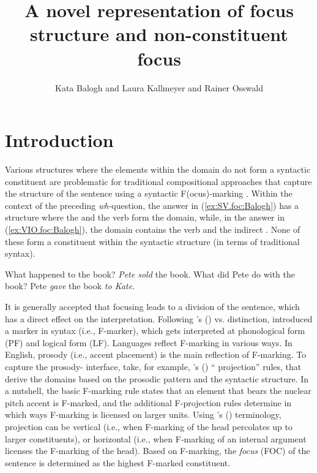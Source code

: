 \documentclass[output=paper,colorlinks,citecolor=brown]{langscibook}
\author{Kata Balogh\orcid{}\affiliation{Heinrich-Heine-Universit\"at D\"usseldorf} and Laura Kallmeyer\orcid{}\affiliation{Heinrich-Heine-Universit\"at D\"usseldorf} and Rainer Osswald\orcid{}\affiliation{Heinrich-Heine-Universit\"at D\"usseldorf}}
\title{A novel representation of focus structure and non-constituent focus }
\begin{document}
\maketitle

\section{Introduction}\label{sec:intro:Balogh}

Various  structures where the elements within the  domain do not form a syntactic constituent are problematic for traditional compositional approaches that capture the  structure of the sentence using a syntactic F(ocus)-marking \citep[see][]{krifka:92,buring:16}. Within the context of the preceding \textit{wh-}question, the answer in (\ref{ex:SV.foc:Balogh}) has a  structure where the  and the verb form the  domain, while, in the answer in (\ref{ex:VIO.foc:Balogh}), the  domain contains the verb and the indirect . None of these form a constituent within the syntactic structure (in terms of traditional syntax).

\ea\label{ex:base:Balogh}
    \ea\label{ex:SV.foc:Balogh} 
    What happened to the book? \emph{Pete sold} the book.
    \ex\label{ex:VIO.foc:Balogh}
    What did Pete do with the book? Pete \emph{gave} the book \emph{to Kate}.
    \z
\z

It is generally accepted that focusing leads to a division of the sentence, which has a direct effect on the interpretation. 
Following 
\citeauthor{chomsky:71}'s (\citeyear{chomsky:71})  vs.  distinction, \citet[][240]{jackendoff:72} introduced a  marker in syntax (i.e., F-marker), which gets interpreted at phonological form (PF) and logical form (LF). Languages reflect F-marking in various ways. In English, prosody (i.e., accent placement) is the main reflection of F-marking. To capture the prosody- interface, take, for example, 
\citeauthor{selkirk:95}'s (\citeyear{selkirk:95}) `` projection'' rules, that derive the  domains based on the prosodic pattern and the syntactic structure. In a nutshell, the basic F-marking rule states that an element that bears the nuclear pitch accent is F-marked, and the additional F-projection rules determine in which ways F-marking is licensed on larger units. Using \citeauthor{buring:06}'s (\citeyear{buring:06}) terminology,  projection can be vertical (i.e., when F-marking of the head percolates up to larger constituents), or horizontal (i.e., when F-marking of an internal argument licenses the F-marking of the head). Based on F-marking, the \textit{focus} (FOC) of the sentence is determined as the highest F-marked constituent.  
\end{document}
